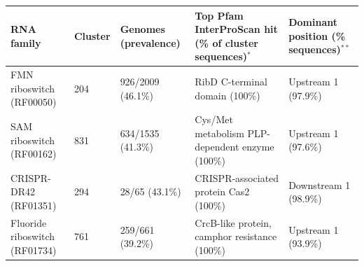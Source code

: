 
\begin{tabular}{p{}p{}p{}p{}p{}}
\hline
\textbf{RNA family} & \textbf{Cluster} & \textbf{Genomes (prevalence)} & \textbf{Top Pfam InterProScan hit (\% of cluster sequences)$^{*}$} & \textbf{Dominant position (\% sequences)$^{**}$} \\
\hline
FMN riboswitch (RF00050) & 204 & 926/2009 (46.1\%) & RibD C-terminal domain (100\%) & Upstream 1 (97.9\%) \\
SAM riboswitch (RF00162) & 831 & 634/1535 (41.3\%) & Cys/Met metabolism PLP-dependent enzyme (100\%) & Upstream 1 (97.6\%) \\
CRISPR-DR42 (RF01351) & 294 & 28/65 (43.1\%) & CRISPR-associated protein Cas2 (100\%) & Downstream 1 (98.9\%) \\
Fluoride riboswitch (RF01734) & 761 & 259/661 (39.2\%) & CrcB-like protein, camphor resistance (100\%) & Upstream 1 (93.9\%) \\
\hline
\end{tabular}